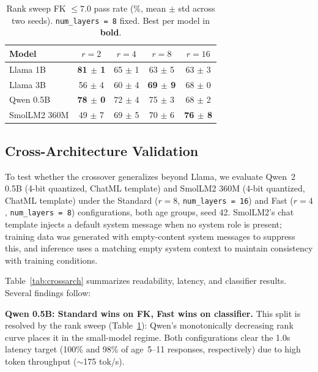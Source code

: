 \documentclass[AMA,Times1COL]{WileyNJDv5} %
\begin{document}
\begin{table}[!t]
  \centering
  \caption{Rank sweep FK $\leq 7.0$ pass rate (\%, mean $\pm$ std across two seeds). \texttt{num\_layers~=~8} fixed. Best per model in \textbf{bold}.}
  \label{tab:ranksweep}
  \footnotesize
  \begin{tabular}{lcccc}
    \hline
    Model        & $r=2$               & $r=4$     & $r=8$               & $r=16$ \\
    \hline
    Llama 1B     & \textbf{81 $\pm$ 1} & 65 $\pm$ 1 & 63 $\pm$ 5         & 63 $\pm$ 3 \\
    Llama 3B     & 56 $\pm$ 4          & 60 $\pm$ 4 & \textbf{69 $\pm$ 9} & 68 $\pm$ 0 \\
    Qwen 0.5B    & \textbf{78 $\pm$ 0} & 72 $\pm$ 4 & 75 $\pm$ 3         & 68 $\pm$ 2 \\
    SmolLM2 360M & 49 $\pm$ 7          & 69 $\pm$ 5 & 70 $\pm$ 6         & \textbf{76 $\pm$ 8} \\
    \hline
  \end{tabular}
\end{table}

\subsection{Cross-Architecture Validation}\label{sec:crossarch}

To test whether the crossover generalizes beyond Llama, we evaluate Qwen~2 0.5B (4-bit quantized, ChatML template) and SmolLM2 360M \cite{allal2025smollm2} (4-bit quantized, ChatML template) under the Standard ($r=8$, \texttt{num\_layers~=~16}) and Fast ($r=4$, \texttt{num\_layers~=~8}) configurations, both age groups, seed 42. SmolLM2's chat template injects a default system message when no system role is present; training data was generated with empty-content system messages to suppress this, and inference uses a matching empty system context to maintain consistency with training conditions.

Table~\ref{tab:crossarch} summarizes readability, latency, and classifier results. Several findings follow:

\textbf{Qwen 0.5B: Standard wins on FK, Fast wins on classifier.} This split is resolved by the rank sweep (Table~\ref{tab:ranksweep}): Qwen's monotonically decreasing rank curve places it in the small-model regime. Both configurations clear the 1.0s latency target (100\% and 98\% of age~5--11 responses, respectively) due to high token throughput ($\sim$175 tok/s).
\end{document}
